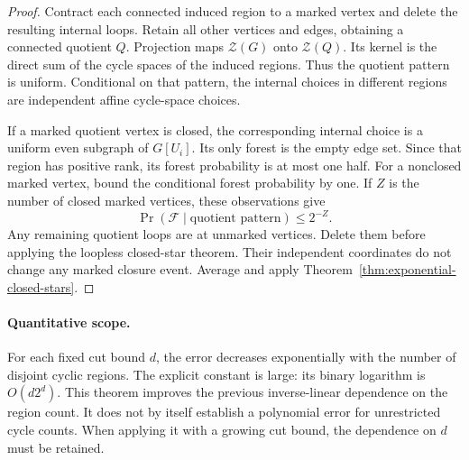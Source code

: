 \begin{proof}
Contract each connected induced region to a marked vertex and delete the resulting internal loops.
Retain all other vertices and edges, obtaining a connected quotient $Q$.
Projection maps $\mathcal Z(G)$ onto $\mathcal Z(Q)$.
Its kernel is the direct sum of the cycle spaces of the induced regions.
Thus the quotient pattern is uniform.
Conditional on that pattern, the internal choices in different regions are independent affine cycle-space choices.

If a marked quotient vertex is closed, the corresponding internal choice is a uniform even subgraph of $G[U_i]$.
Its only forest is the empty edge set.
Since that region has positive rank, its forest probability is at most one half.
For a nonclosed marked vertex, bound the conditional forest probability by one.
If $Z$ is the number of closed marked vertices, these observations give
\[
 \Pr(\mathcal F\mid\text{quotient pattern})\le2^{-Z}.
\]
Any remaining quotient loops are at unmarked vertices.
Delete them before applying the loopless closed-star theorem.
Their independent coordinates do not change any marked closure event.
Average and apply Theorem~\ref{thm:exponential-closed-stars}.
\end{proof}

\paragraph{Quantitative scope.}
For each fixed cut bound $d$, the error decreases exponentially with the number of disjoint cyclic regions.
The explicit constant is large: its binary logarithm is $O(d2^d)$.
This theorem improves the previous inverse-linear dependence on the region count.
It does not by itself establish a polynomial error for unrestricted cycle counts.
When applying it with a growing cut bound, the dependence on $d$ must be retained.
